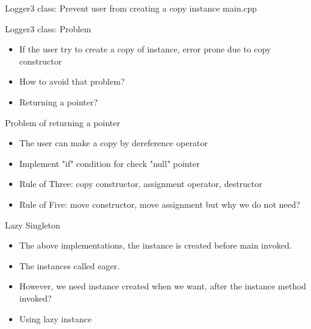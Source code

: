 \documentclass[13pt]{beamer}
\begin{document}
\begin{frame}{Logger3 class: Prevent user from creating a copy instance}
main.cpp
\lstset{basicstyle=\tiny,style=myCustomCppStyle}

\end{frame}

\begin{frame}{Logger3 class: Problem}
\begin{itemize}
\setlength\itemsep{1em}

\item If the user try to create a copy of instance, error prone due to copy constructor

\item How to avoid that problem?

\item Returning a pointer?

\end{itemize}
\end{frame}

\begin{frame}{Problem of returning a pointer}
\begin{itemize}
\setlength\itemsep{1em}

\item The user can make a copy by dereference operator

\item Implement "if" condition for check "null" pointer

\item Rule of Three: copy constructor, assignment operator, destructor

\item Rule of Five: move constructor, move assignment but why we do not need?

\end{itemize}
\end{frame}

\begin{frame}{Lazy Singleton}
\begin{itemize}
\setlength\itemsep{1em}

\item The above implementations, the instance is created before main invoked. 

\item The instances called eager.

\item However, we need instance created when we want, after the instance method invoked?

\item Using lazy instance

\end{itemize}
\end{frame}
\end{document}
